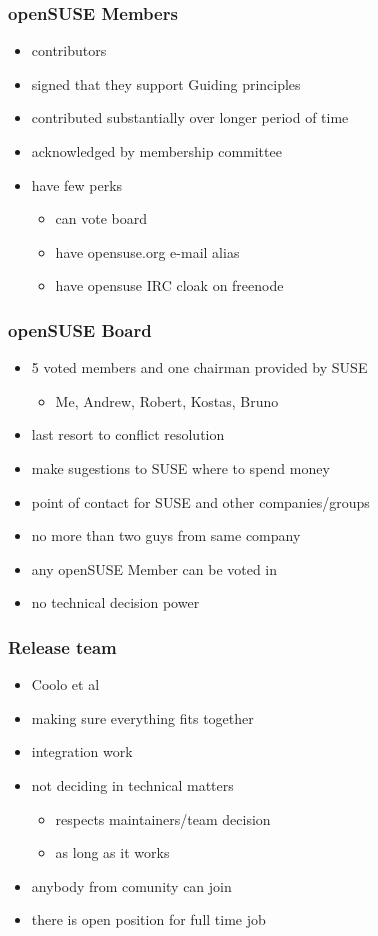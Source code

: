 \documentclass{beamer}
\begin{document}

\begin{frame}[t]
\frametitle{openSUSE Members}
\begin{itemize}
\item contributors
\item signed that they support Guiding principles
\item contributed substantially over longer period of time
\item acknowledged by membership committee
\item have few perks
\begin{itemize}
\item can vote board
\item have opensuse.org e-mail alias
\item have opensuse IRC cloak on freenode
\end{itemize}
\end{itemize}
\end{frame}

\begin{frame}[t]
\frametitle{openSUSE Board}
\begin{itemize}
\item 5 voted members and one chairman provided by SUSE
\begin{itemize}
\item Me, Andrew, Robert, Kostas, Bruno
\end{itemize}
\item last resort to conflict resolution
\item make sugestions to SUSE where to spend money
\item point of contact for SUSE and other companies/groups
\item no more than two guys from same company
\item any openSUSE Member can be voted in
\item no technical decision power
\end{itemize}
\end{frame}

\begin{frame}[t]
\frametitle{Release team}
\begin{itemize}
\item Coolo et al
\item making sure everything fits together
\item integration work
\item not deciding in technical matters
\begin{itemize}
\item respects maintainers/team decision
\item as long as it works
\end{itemize}
\item anybody from comunity can join
\item there is open position for full time job
\end{itemize}
\end{frame}
\end{document}
